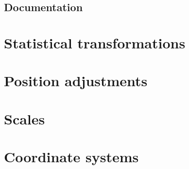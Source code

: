 \subsection{Documentation}
\label{sub:documentation}



\section{Statistical transformations}
\label{sec:statistical_transformations}

\section{Position adjustments}
\label{sec:position_adjustments}

\section{Scales}
\label{sec:scales}

\section{Coordinate systems}
\label{sec:coordinate_systems}




